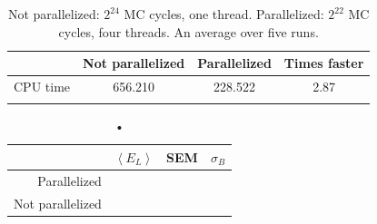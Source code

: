 \begin{table}[H]\caption{Not parallelized: $2^{24}$ MC cycles, one thread. Parallelized: $2^{22}$ MC cycles, four threads. An average over five runs.}\label{tab:CPUtime_parallelization}
\center
\begin{tabular}{r|ccc}
& Not parallelized & Parallelized & Times faster \\ \hline
CPU time &  656.210  & 228.522 & 2.87\\
 &   &  & \\
\end{tabular}
\end{table}

\begin{table}[H]\caption{•}\label{tab:energy_parallelization}
\center
\begin{tabular}{r|ccc}
& $\left< E_L \right>$ & SEM & $\sigma_B$ \\ \hline
Parallelized & \\
Not parallelized & \\
\end{tabular}
\end{table}
